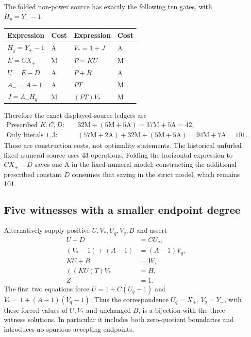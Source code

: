 \documentclass[11pt,letterpaper]{article}
\theoremstyle{definition}\newtheorem{definition}[theorem]{Definition}
\theoremstyle{remark}\newtheorem{remark}[theorem]{Remark}
\begin{document}
The folded non-power source has exactly the following ten gates, with $H_y=Y_+-1$:
\begin{center}
\begin{tabular}{ll@{\qquad}ll}\toprule
Expression & Cost & Expression & Cost\\\midrule
$H_y=Y_+-1$ & A & $V_*=1+J$ & A\\
$E=CX_+$ & M & $P=KU$ & M\\
$U=E-D$ & A & $P+B$ & A\\
$A_-=A-1$ & A & $PT$ & M\\
$J=A_-H_y$ & M & $(PT)V_*$ & M\\\bottomrule
\end{tabular}
\end{center}
Therefore the exact displayed-source ledgers are
\begin{equation}\label{ptr:la:eq:ledger-endpoint}
\begin{aligned}
\text{Prescribed }K,C,D:&\quad32\mathrm M+(5\mathrm M+5\mathrm A)
=37\mathrm M+5\mathrm A=42,\\
\text{Only literals }1,3:&\quad(57\mathrm M+2\mathrm A)+32\mathrm M+(5\mathrm M+5\mathrm A)
=94\mathrm M+7\mathrm A=101.
\end{aligned}
\end{equation}
These are construction costs, not optimality statements. The historical unfurled fixed-numeral source uses 43 operations. Folding the horizontal expression to $CX_+-D$ saves one A in the fixed-numeral model; constructing the additional prescribed constant $D$ consumes that saving in the strict model, which remains 101.

\subsection{Five witnesses with a smaller endpoint degree}
Alternatively supply positive $U,V_*,U_q,V_q,B$ and assert
\begin{align}
 U+D&=CU_q,\label{ptr:la:eq:endpoint-five}\\
 (V_*-1)+(A-1)&=(A-1)V_q,\nonumber\\
 KU+B&=W,\nonumber\\
 ((KU)T)V_*&=H,\nonumber\\
 Z&=1.\nonumber
\end{align}
The first two equations force $U=1+C(U_q-1)$ and $V_*=1+(A-1)(V_q-1)$. Thus the correspondence $U_q=X_+$, $V_q=Y_+$, with these forced values of $U,V_*$ and unchanged $B$, is a bijection with the three-witness solutions. In particular it includes both zero-quotient boundaries and introduces no spurious accepting endpoints.
\end{document}
